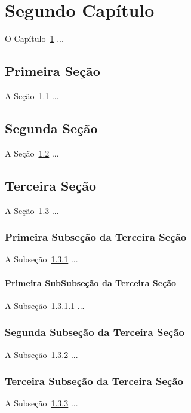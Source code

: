 \chapter{Segundo Capítulo}
\label{cap:segundo} 		%

O Capítulo~\ref{cap:segundo} ...

\section{Primeira Seção}
\label{sec:segundo_1}

A Seção~\ref{sec:segundo_1} ...

\section{Segunda Seção}
\label{sec:segundo_2}

A Seção~\ref{sec:segundo_2} ...

\section{Terceira Seção}
\label{sec:segundo_3}

A Seção~\ref{sec:segundo_3} ...

\subsection{Primeira Subseção da Terceira Seção}
\label{subsec:segundo_3.1}

A Subseção~\ref{subsec:segundo_3.1} ...

\subsubsection{Primeira SubSubseção da Terceira Seção}
\label{subsubsec:segundo_3.1}

A Subseção~\ref{subsubsec:segundo_3.1} ...

\subsection{Segunda Subseção da Terceira Seção}
\label{subsec:segundo_3.2}

A Subseção~\ref{subsec:segundo_3.2} ...

\subsection{Terceira Subseção da Terceira Seção}
\label{subsec:segundo_3.3}

A Subseção~\ref{subsec:segundo_3.3} ...
